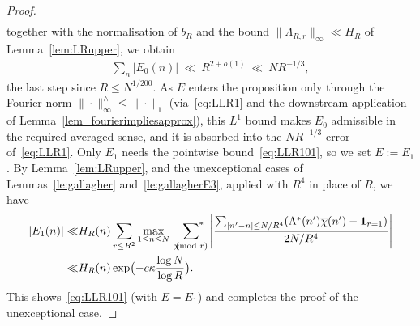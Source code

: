 \documentclass[12pt]{amsart}
\theoremstyle{definition}
\theoremstyle{remark}
\numberwithin{equation}{section}
\newcommand{\asum}{\sideset{}{^{\ast}}\sum}
\newcommand{\1}{\mathbf{1}}
\let\oldpmod\pmod
\renewcommand{\pmod}[1]{\hspace{-0.12cm}\oldpmod {#1}}
\begin{document}
\begin{proof}
\begin{align*}
        \end{align*}
        together with the normalisation of $b_R$ and the bound $\|\Lambda_{R,r}\|_\infty\ll H_R$ of Lemma~\ref{lem:LRupper}, we obtain
        \begin{align*}
          \sum_{n}|E_0(n)|\ \ll\ R^{2+o(1)}\ \ll\ NR^{-1/3},
        \end{align*}
        the last step since $R\le N^{1/200}$. As $E$ enters the proposition only through the Fourier norm $\|\cdot\|_\infty^{\wedge}\le\|\cdot\|_1$ (via~\eqref{eq:LLR1} and the downstream application of Lemma~\ref{lem_fourierimpliesapprox}), this $L^1$ bound makes $E_0$ admissible in the required averaged sense, and it is absorbed into the $NR^{-1/3}$ error of~\eqref{eq:LLR1}. Only $E_1$ needs the pointwise bound~\eqref{eq:LLR101}, so we set $E:=E_1$. By Lemma~\ref{lem:LRupper}, and the unexceptional cases of Lemmas~\ref{le:gallagher} and~\ref{le:gallagherE3}, applied with $R^4$ in place of $R$, we have
        \begin{align*}
            |E_1(n)|\ll& H_R(n)  \sum_{r\leq R^2}\max_{1\leq n\leq N}\,\,\, \asum_{\chi\pmod r}\left|\frac{\sum_{|n'-n|\leq N/R^4} (\Lambda^*(n')\overline{\chi}(n')-\1_{r=1})}{2N/R^4} \right|\\
           \ll & H_R(n)\exp\bigl( -c \kappa \frac{\log N}{\log R} \bigr).
        \end{align*}
    This shows~\eqref{eq:LLR101} (with $E=E_1$)  and completes the proof of the unexceptional case.



\end{proof}
\end{document}
